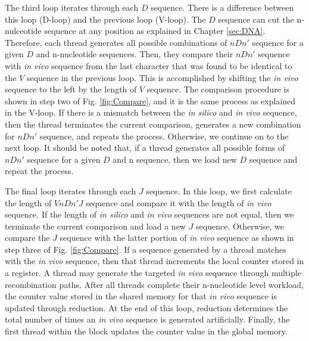 The third loop iterates through each $D$ sequence. There is a difference between this loop (D-loop) and the previous loop (V-loop). The $D$ sequence can cut the n-nulceotide sequence at any position as explained in Chapter \ref{sec:DNA}. Therefore, each thread generates all possible combinations of $nDn'$ sequence for a given $D$ and n-nucleotide sequences. Then, they compare their $nDn'$ sequence with \emph{in vivo} sequence from the last character that was found to be identical to the $V$ sequence in the previous loop. This is accomplished by shifting the \emph{in vivo} sequence to the left by the length of $V$ sequence. The comparison procedure is shown in step two of Fig. \ref{fig:Compare}, and it is the same process as explained in the V-loop. If there is a mismatch between the \emph{in silico} and \emph{in vivo} sequence, then the thread terminates the current comparison, generates a new combination for $nDn'$ sequence, and repeats the process. Otherwise, we continue on to the next loop. It should be noted that, if a thread generates all possible forms of $nDn'$ sequence for a given $D$ and n sequence, then we load new $D$ sequence and repeat the process.

The final loop iterates through each $J$ sequence. In this loop, we first calculate the length of $VnDn'J$ sequence and compare it with the length of \emph{in vivo} sequence. If the length of \emph{in silico} and \emph{in vivo} sequences are not equal, then we terminate the current comparison and load a new $J$ sequence. Otherwise, we compare the $J$ sequence with the latter portion of \emph{in vivo} sequence as shown in step three of Fig. \ref{fig:Compare}. If a sequence generated by a thread matches with the \emph{in vivo} sequence, then that thread increments the local counter stored in a register. A thread may generate the targeted \emph{in vivo} sequence through multiple recombination paths. After all threads complete their n-nucleotide level workload, the counter value stored in the shared memory for that \emph{in vivo} sequence is updated through reduction. At the end of this loop, reduction determines the total number of times an \emph{in vivo} sequence is generated artificially. Finally, the first thread within the block updates the counter value in the global memory.

